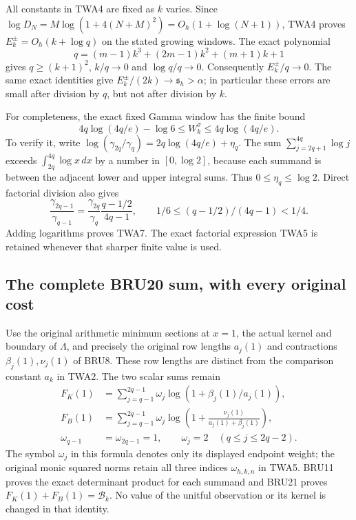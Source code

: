 All constants in TWA4 are fixed as $k$ varies. Since
$\log D_N=M\log(1+4(N+M)^2)=O_h(1+\log(N+1))$, TWA4 proves
$E_k^\pm=O_h(k+\log q)$ on the stated growing windows. The exact
polynomial
\[
q=(m-1)k^3+(2m-1)k^2+(m+1)k+1
\]
gives $q\ge(k+1)^2$, $k/q\to0$ and $\log q/q\to0$. Consequently
$E_k^\pm/q\to0$. The same exact identities give
$E_k^\pm/(2k)\to\mathfrak s_h>\alpha$; in particular these errors
are small after division by $q$, but not after division by $k$.

For completeness, the exact fixed Gamma window has the finite bound
\[
4q\log(4q/e)-\log6\le W_k^\sigma\le4q\log(4q/e).
\tag{TWA7}
\]
To verify it, write
$\log(\gamma_{2q}/\gamma_q)=2q\log(4q/e)+\eta_q$.
The sum $\sum_{j=2q+1}^{4q}\log j$ exceeds
$\int_{2q}^{4q}\log x\,dx$ by a number in $[0,\log2]$, because
each summand is between the adjacent lower and upper integral sums.
Thus $0\le\eta_q\le\log2$. Direct factorial division also gives
\[
\frac{\gamma_{2q-1}}{\gamma_{q-1}}
=\frac{\gamma_{2q}}{\gamma_q}\frac{q-1/2}{4q-1},
\qquad 1/6\le(q-1/2)/(4q-1)<1/4.
\]
Adding logarithms proves TWA7. The exact factorial expression TWA5
is retained whenever that sharper finite value is used.

\subsection{The complete BRU20 sum, with every original cost}

Use the original arithmetic minimum sections at $x=1$, the actual
kernel and boundary of $\Lambda$, and precisely the original row
lengths $a_j(1)$ and contractions $\beta_j(1),\nu_j(1)$ of BRU8.
These row lengths are distinct from the comparison constant $a_k$
in TWA2. The two scalar sums remain
\[
\begin{aligned}
F_K(1)&=\sum_{j=q-1}^{2q-1}\omega_j
          \log(1+\beta_j(1)/a_j(1)),\\
F_B(1)&=\sum_{j=q-1}^{2q-1}\omega_j
          \log\left(1+\frac{\nu_j(1)}{a_j(1)+\beta_j(1)}\right),\\
\omega_{q-1}&=\omega_{2q-1}=1,
\qquad\omega_j=2\quad(q\le j\le2q-2).
\end{aligned}\tag{TWA8}
\]
The symbol $\omega_j$ in this formula denotes only its displayed
endpoint weight; the original monic squared norms retain all three
indices $\omega_{h,k,n}$ in TWA5. BRU11 proves the exact determinant
product for each summand and BRU21 proves
$F_K(1)+F_B(1)=\mathcal B_k$. No value of the unitful observation or
its kernel is changed in that identity.

